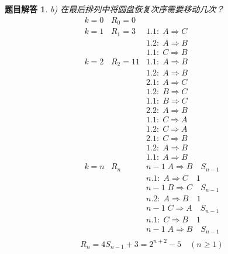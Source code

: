 \documentclass[mode=geye, chinesefont=founder]{elegantnote}
\newtheorem{answer}{题目解答}
\begin{document}
\begin{answer}
	b) 在最后排列中将圆盘恢复次序需要移动几次？
	\begin{equation*}
		\begin{array}{lll}
			k=0	& R_0=0		&	\\
			k=1	& R_1=3		& 1.1:\; A \Rightarrow C\\
				&			& 1.2:\; A \Rightarrow B\\
				&			& 1.1:\; C \Rightarrow B\\
			k=2	& R_2=11	& 1.1:\; A \Rightarrow B\\
				&			& 1.2:\; A \Rightarrow B\\
				&			& 2.1:\; A \Rightarrow C\\
				&			& 1.2:\; B \Rightarrow C\\
				&			& 1.1:\; B \Rightarrow C\\
				&			& 2.2:\; A \Rightarrow B\\
				&			& 1.1:\; C \Rightarrow A\\
				&			& 1.2:\; C \Rightarrow A\\
				&			& 2.1:\; C \Rightarrow B\\
				&			& 1.2:\; A \Rightarrow B\\
				&			& 1.1:\; A \Rightarrow B\\
			k=n	& R_n 		& n-1\;  			A \Rightarrow B\quad S_{n-1}\\
				&			& n.1:\; 			A \Rightarrow C\quad 1		\\	
				&			& n-1\; 			B \Rightarrow C\quad S_{n-1}\\	
				&			& n.2:\; 			A \Rightarrow B\quad 1		\\	
				&			& n-1\; 			C \Rightarrow A\quad S_{n-1}\\	
				&			& n.1:\; 			C \Rightarrow B\quad 1		\\
				&			& n-1\;  			A \Rightarrow B\quad S_{n-1}\\
		\end{array}
	\end{equation*}
\begin{equation*}
	R_n = 4S_{n-1}+3 = 2^{n+2}-5 \quad(n\geqslant 1)
\end{equation*}
\end{answer}
\end{document}

